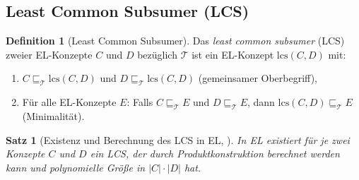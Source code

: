 ﻿\documentclass[a4paper,12pt]{article}
\theoremstyle{definition}
\newtheorem{definition}{Definition}[section]
\theoremstyle{plain}
\newtheorem{satz}{Satz}[section]
\theoremstyle{remark}
\newcommand{\Tbox}{\ensuremath{\mathcal{T}}}
\begin{document}
\subsection{Least Common Subsumer (LCS)}

\begin{definition}[Least Common Subsumer]
\label{def:lcs}
Das \emph{least common subsumer} (LCS) zweier \textsf{EL}-Konzepte
$C$ und $D$ bez{\"{u}}glich $\Tbox$ ist ein \textsf{EL}-Konzept
$\mathrm{lcs}(C, D)$ mit:
\begin{enumerate}[label=(\roman*)]
  \item $C \sqsubseteq_\Tbox \mathrm{lcs}(C,D)$
        und $D \sqsubseteq_\Tbox \mathrm{lcs}(C,D)$
        (gemeinsamer Oberbegriff),
  \item F{\"{u}}r alle \textsf{EL}-Konzepte $E$:
        Falls $C \sqsubseteq_\Tbox E$ und $D \sqsubseteq_\Tbox E$,
        dann $\mathrm{lcs}(C,D) \sqsubseteq_\Tbox E$
        (Minimalit{\"{a}}t).
\end{enumerate}
\end{definition}

\begin{satz}[Existenz und Berechnung des LCS in EL, \cite{Baader1999}]
\label{satz:lcs}
In \textsf{EL} existiert f{\"{u}}r je zwei Konzepte $C$ und $D$
ein LCS, der durch Produktkonstruktion berechnet werden kann
und polynomielle Gr{\"{o}}{\ss}e in $|C| \cdot |D|$ hat.
\end{satz}
\end{document}
